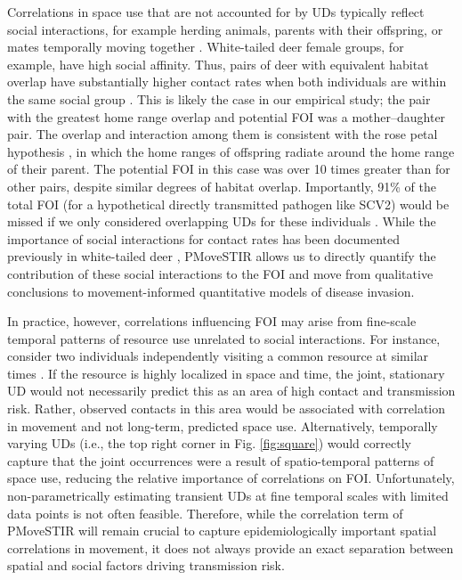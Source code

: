 \documentclass[letterpaper]{article}
\begin{document}
Correlations in space use that are not accounted for by UDs typically reflect social interactions, for example
herding animals, parents with their offspring, or mates temporally moving together \citep{Scharf2016,Yang2021}. 
White-tailed deer female groups, for example, have high social affinity. Thus, pairs of deer with equivalent habitat overlap have substantially higher contact rates when both individuals are within the same social group \citep{Schauber2007a,Kjaer2008,Schauber2015a,Grear2010}. This is likely the case in our empirical study; the pair with the greatest home range overlap and potential FOI was a mother--daughter pair. The overlap and interaction among them is consistent with the rose petal hypothesis \citep{Porter1991}, in which the home ranges of offspring radiate around the home range of their parent. The potential FOI in this case was over 10 times greater than for other pairs, despite similar degrees of habitat overlap. Importantly, 91\% of the total FOI (for a hypothetical directly transmitted pathogen like SCV2) would be missed if we only considered overlapping UDs for these individuals \citep[e.g., using a metric like CDE][]{Noonan2021}. While the importance of social interactions for contact rates has been documented previously in white-tailed deer \citep{Grear2010,Schauber2015a}, PMoveSTIR allows us to directly quantify the contribution of these social interactions to the FOI and move from qualitative conclusions to movement-informed quantitative models of disease invasion.

In practice, however, correlations influencing FOI may arise from fine-scale temporal patterns of resource use unrelated to social interactions. For instance, consider two individuals independently visiting a common resource at similar times \citep[e.g., a watering hole,][]{VanderWaal2017}. If the resource is highly localized in space and time, the joint, stationary UD would not necessarily predict this as an area of high contact and transmission risk. Rather, observed contacts in this area would be associated with correlation in movement and not long-term, predicted space use.
Alternatively, temporally varying UDs (i.e., the top right corner in Fig. \ref{fig:square}) would correctly capture that the joint occurrences were a result of spatio-temporal patterns of space use, reducing the relative importance of correlations on FOI. Unfortunately, non-parametrically estimating transient UDs at fine temporal scales with limited data points is not often feasible. Therefore, while the correlation term of PMoveSTIR will remain crucial to capture epidemiologically important spatial correlations in movement, it does not always provide an exact separation between spatial and social factors driving transmission risk.
\end{document}
